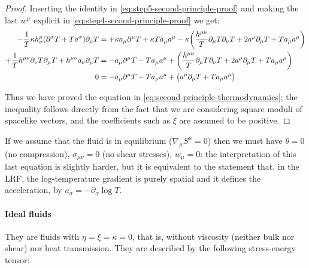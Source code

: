 \documentclass[main.tex]{subfiles}
\begin{document}
\begin{proof}
    Inserting the identity in \eqref{eq:step5-second-principle-proof}  and making the last \(w^\mu\) explicit in \eqref{eq:step4-second-principle-proof} we get:
    \begin{subequations}
    \begin{align}
      -\frac{1}{T} \kappa h^\mu _\sigma  \qty(\partial^\sigma T + T a^\sigma) \partial_\mu T  &= + \kappa a_\mu \partial^\mu T + \kappa T a_\mu a^\mu
      -\kappa \qty(\frac{h^{\mu\nu}}{T} \partial_\mu T \partial_\nu T + 2 a^\mu \partial_\mu T + T a_\mu a^\mu) \\
      +\frac{1}{T} h^{\mu\nu} \partial_\nu T  \partial_\mu T + h^{\mu\nu} a_\nu \partial_\mu T  &= - a_\mu \partial^\mu T -  T a_\mu a^\mu
      + \qty(\frac{h^{\mu\nu}}{T} \partial_\mu T \partial_\nu T + 2 a^\mu \partial_\mu T + T a_\mu a^\mu) \\
      0  &= - a_\mu \partial^\mu T -  T a_\mu a^\mu
      + \qty( a^\mu \partial_\mu T + T a_\mu a^\mu)
    \end{align}
    \end{subequations}

    Thus we have proved the equation in \eqref{eq:second-principle-thermodynamics}; the inequality follows directly from the fact that we are considering square moduli of spacelike vectors, and the coefficients such as \(\xi\) are assumed to be positive.
\end{proof}

If we assume that the fluid is in equilibrium (\(\nabla_\mu S^\mu = 0\)) then we must have \(\theta = 0\) (no compression), \(\sigma_{\mu\nu} = 0 \) (no shear stresses), \(w_\mu=0\): the interpretation of this last equation is slightly harder, but it is equivalent to the statement that, in the LRF, the log-temperature gradient is purely spatial and it defines the acceleration, by \(a_\sigma = - \partial_\sigma \log T\).

%


\paragraph{Ideal fluids}

They are fluids with \(\eta=\xi=\kappa=0\), that is, without viscosity (neither bulk nor shear) nor heat transmission.
They are described by the following stress-energy tensor:
\end{document}
